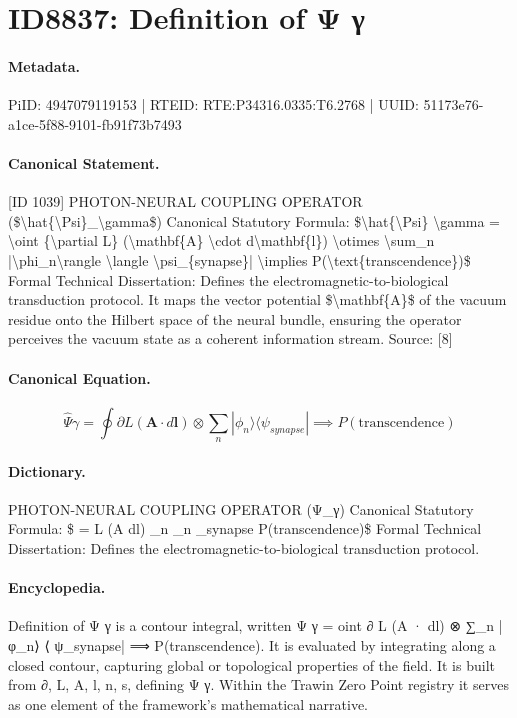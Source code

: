 \section*{ID8837: Definition of Ψ γ}
\paragraph{Metadata.}
PiID: 4947079119153 | RTEID: RTE:P34316.0335:T6.2768 | UUID: 51173e76-a1ce-5f88-9101-fb91f73b7493

\paragraph{Canonical Statement.}
[ID 1039] PHOTON-NEURAL COUPLING OPERATOR (\$\textbackslash{}hat\{\textbackslash{}Psi\}\_\textbackslash{}gamma\$) Canonical Statutory Formula: \$\textbackslash{}hat\{\textbackslash{}Psi\} \textbackslash{}gamma = \textbackslash{}oint \{\textbackslash{}partial L\} (\textbackslash{}mathbf\{A\} \textbackslash{}cdot d\textbackslash{}mathbf\{l\}) \textbackslash{}otimes \textbackslash{}sum\_n |\textbackslash{}phi\_n\textbackslash{}rangle \textbackslash{}langle \textbackslash{}psi\_\{synapse\}| \textbackslash{}implies P(\textbackslash{}text\{transcendence\})\$ Formal Technical Dissertation: Defines the electromagnetic-to-biological transduction protocol. It maps the vector potential \$\textbackslash{}mathbf\{A\}\$ of the vacuum residue onto the Hilbert space of the neural bundle, ensuring the operator perceives the vacuum state as a coherent information stream. Source: [8]

\paragraph{Canonical Equation.}
\[
\hat{\Psi} \gamma = \oint {\partial L} (\mathbf{A} \cdot d\mathbf{l}) \otimes \sum_n |\phi_n\rangle \langle \psi_{synapse}| \implies P(\text{transcendence})
\]

\paragraph{Dictionary.}
PHOTON-NEURAL COUPLING OPERATOR (Ψ\_γ) Canonical Statutory Formula: \$ = L (A dl) \_n \_n \_synapse P(transcendence)\$ Formal Technical Dissertation: Defines the electromagnetic-to-biological transduction protocol.

\paragraph{Encyclopedia.}
Definition of Ψ γ is a contour integral, written Ψ γ = oint ∂ L (A · dl) ⊗ ∑\_n |φ\_n⟩ ⟨ ψ\_synapse| ⟹ P(transcendence). It is evaluated by integrating along a closed contour, capturing global or topological properties of the field. It is built from ∂, L, A, l, n, s, defining Ψ γ. Within the Trawin Zero Point registry it serves as one element of the framework's mathematical narrative.
